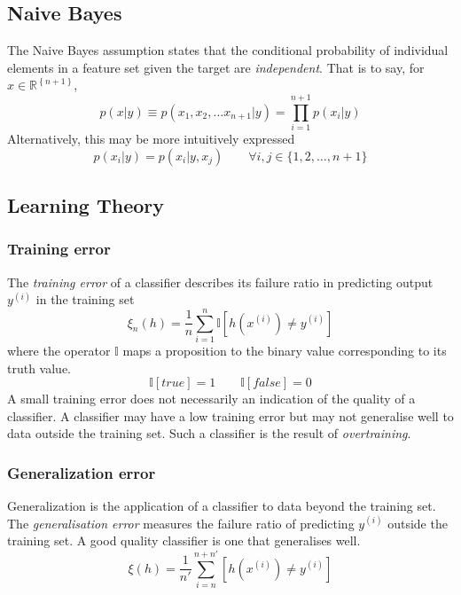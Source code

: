 \documentclass{article}
\theoremstyle{definition}
\theoremstyle{remark}
\begin{document}
\subsection{Naive Bayes}
The Naive Bayes assumption states that the conditional probability of individual elements in a feature set given the target are \textit{independent}.
That is to say, for $x\in\mathbb{R}^\left\{ n + 1 \right\}$,
\begin{equation}
  p(x|y) \equiv p(x_{1}, x_{2}, \dots x_{n+1}| y) = \prod_{i = 1}^{n+1}p(x_{i}|y)
  \label{eqn:naivebayesassumption}
\end{equation}
Alternatively, this may be more intuitively expressed 
\begin{equation}
  p(x_{i}|y) = p(x_{i}|y, x_{j}) \qquad \forall i,j \in \{1, 2, \dots, n + 1\}
  \label{eqn:intuitivenaivebayes}
\end{equation}

\subsection{Learning Theory}
\subsubsection{Training error}
The \textit{training error} of a classifier describes its failure ratio in predicting output $y^{(i)}$ in the training set
\begin{equation}
  \xi_{n}(h) = \frac{1}{n} \sum_{i=1}^{n} \mathbb{I}\left[ h(x^{(i)}) \neq y^{(i)}\right]
\end{equation}
where the operator $\mathbb{I}$ maps a proposition to the binary value corresponding to its truth value.
\[
  \mathbb{I}\left[true\right] = 1 \qquad \mathbb{I}\left[false\right] = 0
\]
A small training error does not necessarily an indication of the quality of a classifier. 
A classifier may have a low training error but may not generalise well to data outside the training set. Such a classifier is the result of \textit{overtraining}.
\subsubsection{Generalization error}
Generalization is the application of a classifier to data beyond the training set. 
The \textit{generalisation error} measures the failure ratio of predicting $y^{(i)}$ outside the training set.
A good quality classifier is one that generalises well.
\begin{equation}
  \xi (h) = \frac{1}{n'} \sum_{i = n}^{n + n'} \left[ h(x^{(i)}) \neq y^{(i)}\right]
\end{equation}
\end{document}
